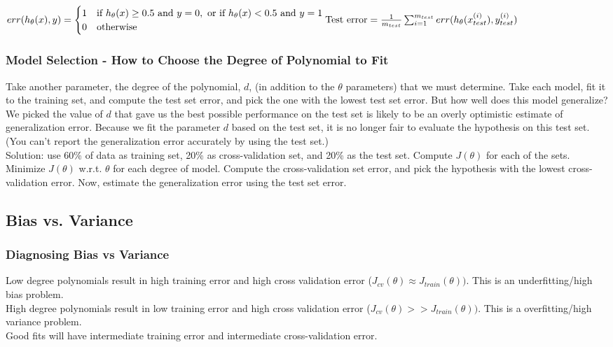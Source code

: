 \documentclass[11pt,letterpaper]{article}
\begin{document}
\( err(h_\theta(x), y) =
\begin{cases}
      1 & \textrm{if } h_\theta(x) \geq 0.5 \textrm{ and } y = 0, \textrm{ or if } h_\theta(x) < 0.5 \textrm { and } y = 1\\
      0 & \textrm{otherwise}
\end{cases} \\
\textrm{Test error} = \frac{1}{m	_{test}} \sum_{i=1}^{m_{test}}err(h_\theta(x_{test}^{(i)}), y_{test}^{(i)})
\)

\subsubsection{Model Selection - How to Choose the Degree of Polynomial to Fit}
Take another parameter, the degree of the polynomial, $d$, (in addition to the $\theta$ parameters) that we must determine. Take each model, fit it to the training set, and compute the test set error, and pick the one with the lowest test set error. But how well does this model generalize? We picked the value of $d$ that gave us the best possible performance on the test set is likely to be an overly optimistic estimate of generalization error. Because we fit the parameter $d$ based on the test set, it is no longer fair to evaluate the hypothesis on this test set. (You can't report the generalization error accurately by using the test set.) \\
Solution: use 60\% of data as training set, 20\% as cross-validation set, and 20\% as the test set. Compute $J(\theta)$ for each of the sets. Minimize $J(\theta)$ w.r.t. $\theta$ for each degree of model. Compute the cross-validation set error, and pick the hypothesis with the lowest cross-validation error. Now, estimate the generalization error using the test set error.

\subsection{Bias vs. Variance}
\subsubsection{Diagnosing Bias vs Variance}
Low degree polynomials result in high training error and high cross validation error ($J_{cv}(\theta) \approx J_{train}(\theta))$. This is an underfitting/high bias problem.\\
High degree polynomials result in low training error and high cross validation error ($J_{cv}(\theta) >> J_{train}(\theta))$. This is a overfitting/high variance problem.\\
Good fits will have intermediate training error and intermediate cross-validation error.
\end{document}
